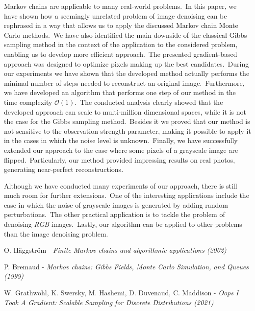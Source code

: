 \documentclass[shortabstract, english, lic]{iithesis}
\theoremstyle{default_theorem_style}\newtheorem{theorem}{Theorem}
\theoremstyle{default_theorem_style}\newtheorem{definition}{Definition}
\begin{document}
Markov chains are applicable to many real-world problems.\ In this paper, we have shown how a seemingly unrelated
problem of image denoising can be rephrased in a way that allows us to apply the discussed Markov chain Monte Carlo
methods.\ We have also identified the main downside of the classical Gibbs sampling method in the context of the
application to the considered problem, enabling us to develop more efficient approach.\ The presented
gradient-based approach was designed to optimize pixels making up the best candidates.\ During our experiments we have
shown that the developed method actually performs the minimal number of steps needed to reconstruct an original
image.\ Furthermore, we have developed an algorithm that performs one step of our method in the time complexity
$\mathcal{O}(1)$.\ The conducted analysis clearly showed that the developed approach can scale to multi-million
dimensional spaces, while it is not the case for the Gibbs sampling method.\ Besides it we proved that our method is
not sensitive to the observation strength parameter, making it possible to apply it in the cases in which the
noise level is unknown.\ Finally, we have successfully extended our approach to the case where some pixels of
a grayscale image are flipped.\ Particularly, our method provided impressing results on real photos, generating
near-perfect reconstructions.\newline

\noindent Although we have conducted many experiments of our approach, there is still much room for further
extensions.\ One of the interesting applications include the case in which the noise of grayscale images is
generated by adding random perturbations.\ The other practical application is to tackle the problem of
denoising \textit{RGB} images.\ Lastly, our algorithm can be applied to other problems than the image denoising problem.


\begin{thebibliography}{9}

O. Häggström - \textit{Finite Markov chains and algorithmic applications (2002)}

P. Bremaud - \textit{Markov chains: Gibbs Fields, Monte Carlo Simulation, and Queues (1999)}

W. Grathwohl, K. Swersky, M. Hashemi, D. Duvenaud, C. Maddison -
\textit{Oops I Took A Gradient: Scalable Sampling for Discrete Distributions (2021)}

\end{thebibliography}
\end{document}
